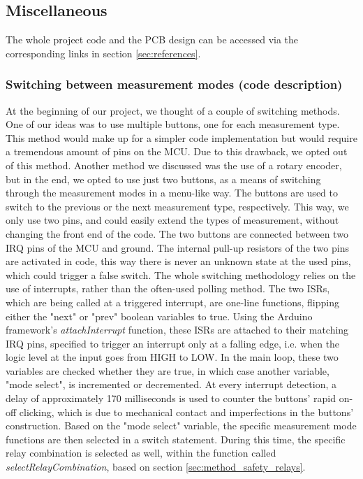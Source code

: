 \newpage
\subsection{Miscellaneous}
The whole project code and the PCB design can be accessed via the corresponding links in section \ref{sec:references}.

\subsubsection{Switching between measurement modes (code description)}
\label{sec:method_switch_code}
At the beginning of our project, we thought of a couple of switching methods. One of our ideas was to use multiple buttons, one for each measurement type. This method would make up for a simpler code implementation but would require a tremendous amount of pins on the MCU. Due to this drawback, we opted out of this method. Another method we discussed was the use of a rotary encoder, but in the end, we opted to use just two buttons, as a means of switching through the measurement modes in a menu-like way. The buttons are used to switch to the previous or the next measurement type, respectively. This way, we only use two pins, and could easily extend the types of measurement, without changing the front end of the code. The two buttons are connected between two IRQ pins of the MCU and ground. The internal pull-up resistors of the two pins are activated in code, this way there is never an unknown state at the used pins, which could trigger a false switch. The whole switching methodology relies on the use of interrupts, rather than the often-used polling method. The two ISRs, which are being called at a triggered interrupt, are one-line functions, flipping either the "next" or "prev" boolean variables to true. Using the Arduino framework's \textit{attachInterrupt} function, these ISRs are attached to their matching IRQ pins, specified to trigger an interrupt only at a falling edge, i.e. when the logic level at the input goes from HIGH to LOW. In the main loop, these two variables are checked whether they are true, in which case another variable, "mode select", is incremented or decremented. At every interrupt detection, a delay of approximately 170 milliseconds is used to counter the buttons' rapid on-off clicking, which is due to mechanical contact and imperfections in the buttons' construction. Based on the "mode select" variable, the specific measurement mode functions are then selected in a switch statement. During this time, the specific relay combination is selected as well, within the function called \textit{selectRelayCombination}, based on section \ref{sec:method_safety_relays}.

